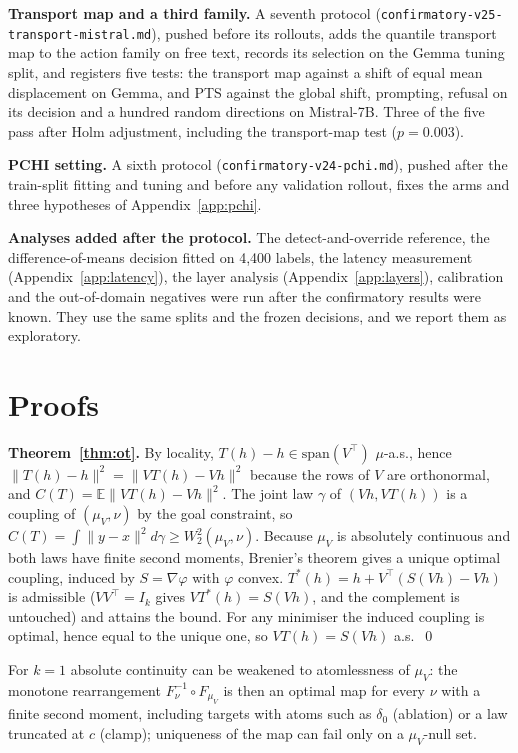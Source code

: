 \documentclass{article}
\newcommand{\Wtwo}{W_2}
\begin{document}
\textbf{Transport map and a third family.} A seventh protocol
(\texttt{confirmatory-v25-transport-mistral.md}), pushed before its rollouts,
adds the quantile transport map to the action family on free text, records its
selection on the Gemma tuning split, and registers five tests: the transport
map against a shift of equal mean displacement on Gemma, and PTS against the
global shift, prompting, refusal on its decision and a hundred random
directions on Mistral-7B. Three of the five pass after Holm adjustment,
including the transport-map test ($p=0.003$).

\textbf{PCHI setting.} A sixth protocol (\texttt{confirmatory-v24-pchi.md}),
pushed after the train-split fitting and tuning and before any validation
rollout, fixes the arms and three hypotheses of Appendix~\ref{app:pchi}.

\textbf{Analyses added after the protocol.} The detect-and-override reference,
the difference-of-means decision fitted on 4{,}400 labels, the latency
measurement (Appendix~\ref{app:latency}), the layer analysis
(Appendix~\ref{app:layers}), calibration and the out-of-domain negatives were run
after the confirmatory results were known. They use the same splits and the
frozen decisions, and we report them as exploratory.

\section{Proofs}
\label{app:proofs}

\textbf{Theorem~\ref{thm:ot}.} By locality, $T(h)-h\in\mathrm{span}(V^\top)$
$\mu$-a.s., hence $\lVert T(h)-h\rVert^2=\lVert VT(h)-Vh\rVert^2$ because the
rows of $V$ are orthonormal, and $C(T)=\mathbb{E}\lVert VT(h)-Vh\rVert^2$. The
joint law $\gamma$ of $(Vh,VT(h))$ is a coupling of $(\mu_V,\nu)$ by the goal
constraint, so $C(T)=\int\lVert y-x\rVert^2d\gamma\ge\Wtwo^2(\mu_V,\nu)$.
Because $\mu_V$ is absolutely continuous and both laws have finite second
moments, Brenier's theorem gives a unique optimal coupling, induced by
$S=\nabla\varphi$ with $\varphi$ convex. $T^*(h)=h+V^\top(S(Vh)-Vh)$ is
admissible ($VV^\top=I_k$ gives $VT^*(h)=S(Vh)$, and the complement is
untouched) and attains the bound. For any minimiser the induced coupling is
optimal, hence equal to the unique one, so $VT(h)=S(Vh)$ a.s.\ \qed

For $k=1$ absolute continuity can be weakened to atomlessness of $\mu_V$: the
monotone rearrangement $F_\nu^{-1}\circ F_{\mu_V}$ is then an optimal map for
every $\nu$ with a finite second moment, including targets with atoms such as
$\delta_0$ (ablation) or a law truncated at $c$ (clamp); uniqueness of the map
can fail only on a $\mu_V$-null set.
\end{document}
